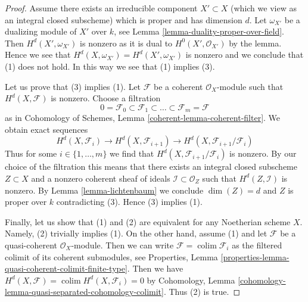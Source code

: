 \documentclass{stacks-project}
\theoremstyle{plain}
\theoremstyle{definition}
\theoremstyle{remark}
\numberwithin{equation}{subsection}
\def\colim{\mathop{\mathrm{colim}}\nolimits}
\begin{document}
\begin{proof}
Assume there exists an irreducible component $X' \subset X$ (which we view
as an integral closed subscheme) which is proper and has dimension $d$.
Let $\omega_{X'}$ be a dualizing module of $X'$ over $k$, see
Lemma \ref{lemma-duality-proper-over-field}. Then
$H^d(X', \omega_{X'})$ is nonzero as it is dual to $H^0(X', \mathcal{O}_{X'})$
by the lemma. Hence we see that $H^d(X, \omega_{X'}) = H^d(X', \omega_{X'})$
is nonzero and we conclude that (1) does not hold.
In this way we see that (1) implies (3).

\medskip\noindent
Let us prove that (3) implies (1).
Let $\mathcal{F}$ be a coherent $\mathcal{O}_X$-module such that
$H^d(X, \mathcal{F})$ is nonzero. Choose a filtration
$$
0 = \mathcal{F}_0 \subset \mathcal{F}_1 \subset
\ldots \subset \mathcal{F}_m = \mathcal{F}
$$
as in Cohomology of Schemes, Lemma \ref{coherent-lemma-coherent-filter}.
We obtain exact sequences
$$
H^d(X, \mathcal{F}_i) \to H^d(X, \mathcal{F}_{i + 1}) \to
H^d(X, \mathcal{F}_{i + 1}/\mathcal{F}_i)
$$
Thus for some $i \in \{1, \ldots, m\}$ we find that
$H^d(X, \mathcal{F}_{i + 1}/\mathcal{F}_i)$ is nonzero.
By our choice of the filtration this means that there exists
an integral closed subscheme $Z \subset X$
and a nonzero coherent sheaf of ideals $\mathcal{I} \subset \mathcal{O}_Z$
such that $H^d(Z, \mathcal{I})$ is nonzero.
By Lemma \ref{lemma-lichtenbaum}
we conclude $\dim(Z) = d$ and $Z$ is proper over $k$
contradicting (3). Hence (3) implies (1).

\medskip\noindent
Finally, let us show that (1) and (2) are equivalent for any Noetherian scheme
$X$. Namely, (2) trivially implies (1). On the other hand, assume (1) and
let $\mathcal{F}$ be a quasi-coherent $\mathcal{O}_X$-module. Then we can write
$\mathcal{F} = \colim \mathcal{F}_i$ as the filtered colimit of its coherent
submodules, see
Properties, Lemma \ref{properties-lemma-quasi-coherent-colimit-finite-type}.
Then we have $H^d(X, \mathcal{F}) = \colim H^d(X, \mathcal{F}_i) = 0$
by Cohomology, Lemma \ref{cohomology-lemma-quasi-separated-cohomology-colimit}.
Thus (2) is true.
\end{proof}










\end{document}
